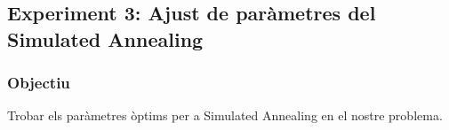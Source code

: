 
\subsection{Experiment 3: Ajust de paràmetres del Simulated Annealing}

\subsubsection{Objectiu}
Trobar els paràmetres òptims per a Simulated Annealing en el nostre problema.





